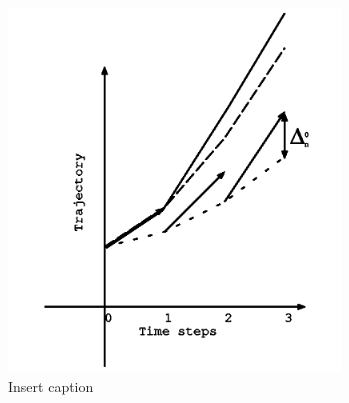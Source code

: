 \documentclass[9pt]{beamer}
\begin{document}
\begin{frame}
\begin{columns}
\begin{figure}
\includegraphics[scale=0.4]{parareal2.png}
\caption{Insert caption}
\end{figure}
\end{columns}
\end{frame}
\end{document}
